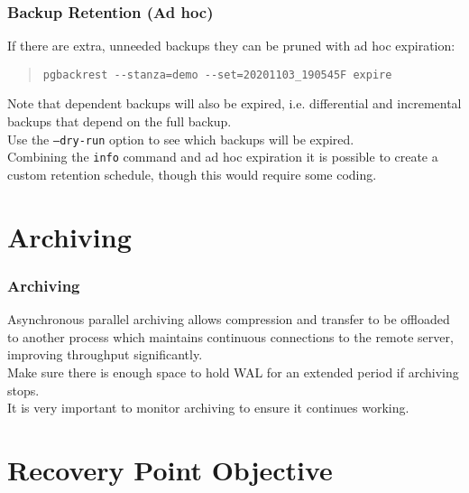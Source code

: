 \begin{frame}[fragile]
    \frametitle{Backup Retention (Ad hoc)}

    If there are extra, unneeded backups they can be pruned with ad hoc expiration:

    \begin{quote}\begin{verbatim}
pgbackrest --stanza=demo --set=20201103_190545F expire
    \end{verbatim}\end{quote}\vspace{-1em}

    Note that dependent backups will also be expired, i.e. differential and incremental backups that depend on the full backup.
    \\\vspace{1em}
    Use the \texttt{--dry-run} option to see which backups will be expired.
    \\\vspace{1em}
    Combining the \texttt{info} command and ad hoc expiration it is possible to create a custom retention schedule, though this would require some coding.
\end{frame}

\section{Archiving}

\begin{frame}
    \frametitle{Archiving}

    Asynchronous parallel archiving allows compression and transfer to be offloaded to another process which maintains continuous connections to the remote server, improving throughput significantly.
    \\\vspace{1em}
    Make sure there is enough space to hold WAL for an extended period if archiving stops.
    \\\vspace{1em}
    It is very important to monitor archiving to ensure it continues working.
\end{frame}

\section{Recovery Point Objective}

